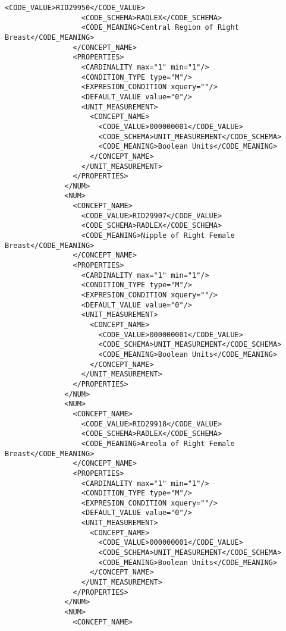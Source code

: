 \begin{lstlisting}[label=dicom-template,caption=Plantilla de un informe estructurado de una exploración de mama]
                  <CODE_VALUE>RID29950</CODE_VALUE>
                  <CODE_SCHEMA>RADLEX</CODE_SCHEMA>
                  <CODE_MEANING>Central Region of Right Breast</CODE_MEANING>
                </CONCEPT_NAME>
                <PROPERTIES>
                  <CARDINALITY max="1" min="1"/>
                  <CONDITION_TYPE type="M"/>
                  <EXPRESION_CONDITION xquery=""/>
                  <DEFAULT_VALUE value="0"/>
                  <UNIT_MEASUREMENT>
                    <CONCEPT_NAME>
                      <CODE_VALUE>000000001</CODE_VALUE>
                      <CODE_SCHEMA>UNIT_MEASUREMENT</CODE_SCHEMA>
                      <CODE_MEANING>Boolean Units</CODE_MEANING>
                    </CONCEPT_NAME>
                  </UNIT_MEASUREMENT>
                </PROPERTIES>
              </NUM>
              <NUM>
                <CONCEPT_NAME>
                  <CODE_VALUE>RID29907</CODE_VALUE>
                  <CODE_SCHEMA>RADLEX</CODE_SCHEMA>
                  <CODE_MEANING>Nipple of Right Female Breast</CODE_MEANING>
                </CONCEPT_NAME>
                <PROPERTIES>
                  <CARDINALITY max="1" min="1"/>
                  <CONDITION_TYPE type="M"/>
                  <EXPRESION_CONDITION xquery=""/>
                  <DEFAULT_VALUE value="0"/>
                  <UNIT_MEASUREMENT>
                    <CONCEPT_NAME>
                      <CODE_VALUE>000000001</CODE_VALUE>
                      <CODE_SCHEMA>UNIT_MEASUREMENT</CODE_SCHEMA>
                      <CODE_MEANING>Boolean Units</CODE_MEANING>
                    </CONCEPT_NAME>
                  </UNIT_MEASUREMENT>
                </PROPERTIES>
              </NUM>
              <NUM>
                <CONCEPT_NAME>
                  <CODE_VALUE>RID29918</CODE_VALUE>
                  <CODE_SCHEMA>RADLEX</CODE_SCHEMA>
                  <CODE_MEANING>Areola of Right Female Breast</CODE_MEANING>
                </CONCEPT_NAME>
                <PROPERTIES>
                  <CARDINALITY max="1" min="1"/>
                  <CONDITION_TYPE type="M"/>
                  <EXPRESION_CONDITION xquery=""/>
                  <DEFAULT_VALUE value="0"/>
                  <UNIT_MEASUREMENT>
                    <CONCEPT_NAME>
                      <CODE_VALUE>000000001</CODE_VALUE>
                      <CODE_SCHEMA>UNIT_MEASUREMENT</CODE_SCHEMA>
                      <CODE_MEANING>Boolean Units</CODE_MEANING>
                    </CONCEPT_NAME>
                  </UNIT_MEASUREMENT>
                </PROPERTIES>
              </NUM>
              <NUM>
                <CONCEPT_NAME>

\end{lstlisting}
